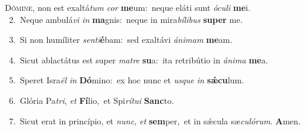 \lettrine{\initial\textcolor{\initialcolor}{D}}{ómine,} non est exaltá\textit{tum} \textit{cor} \textbf{me}\-um:~\star neque eláti sunt \textit{ó}\-\textit{cu}\textit{li} \textbf{me}\-i.\\
{\numbfont\textcolor{\numbcolor}{~2.}}~Neque ambulá\textit{vi} \textit{in} \textbf{ma}\-gnis:~\star neque in mira\-\textit{bí}\-\textit{li}\textit{bus} \textbf{su}\-\textbf{per} me.\par
{\numbfont\textcolor{\numbcolor}{~3.}}~Si non humíliter \textit{sen}\-\textit{ti}\textbf{é}bam:~\star sed exaltávi \textit{á}\-\textit{ni}\textit{mam} \textbf{me}\-am.\par
{\numbfont\textcolor{\numbcolor}{~4.}}~Sicut ablactátus est super \textit{ma}\-\textit{tre} \textbf{su}\-a:~\star ita retribútio in \textit{á}\-\textit{ni}\textit{ma} \textbf{me}\-a.\par
{\numbfont\textcolor{\numbcolor}{~5.}}~Speret Isra\textit{ël} \textit{in} \textbf{Dó}\-mino:~\star ex hoc nunc et \textit{us}\-\textit{que} \textit{in} \textbf{sǽ}\-\textbf{cu}lum.\par
{\numbfont\textcolor{\numbcolor}{~6.}}~Glória Pa\-\textit{tri}\-, \textit{et} \textbf{Fí}\-lio,~\star et Spi\-\textit{rí}\-\textit{tu}\textit{i} \textbf{Sanc}\-to.\par
{\numbfont\textcolor{\numbcolor}{~7.}}~Sicut erat in princípio, et \textit{nunc}\-, \textit{et} \textbf{sem}\-per,~\star et in sǽcula sæ\-\textit{cu}\-\textit{ló}\textit{rum}. \textbf{A}\-men.\par
